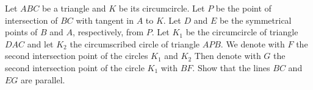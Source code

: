 Let $ABC$ be a triangle and  $K$ be its circumcircle.  Let $P$ be the point of intersection
of $BC$ with tangent in $A$ to $K$. Let $D$ and $E$ be the symmetrical points of $B$ and $A$,  respectively,
from  $P$.  Let $K_1$ be
the circumcircle of triangle $DAC$ and let $K_2$
the circumscribed circle of triangle $APB$. We denote with $F$ the second intersection point of the circles $K_1$ and $K_2$
Then denote with $G$ the second intersection point of the circle $K_1$ with $BF$.
Show that the lines $BC$ and $EG$ are parallel.
